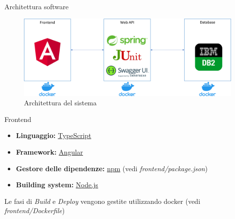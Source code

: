 \documentclass[10pt]{beamer}
\begin{document}
\begin{frame}{Architettura software}
	\begin{figure}[h]
		\centering
		\includegraphics[width=1\textwidth]
		{../images/software-architecture-diagram}
		
		\caption{Architettura del sistema}
	\end{figure}
\end{frame}

\begin{frame}{Frontend}
	
	\begin{itemize}
	
		\item
		\textbf{Linguaggio:} \href{https://www.typescriptlang.org/}{TypeScript}
		
		\item
		\textbf{Framework:} \href{https://angular.io/}{Angular}

		\item
		\textbf{Gestore delle dipendenze:} \href{https://www.npmjs.com/}{npm} (vedi \emph{frontend/package.json})
		
		\item
		\textbf{Building system:} \href{https://nodejs.org/}{Node.js}

	\end{itemize}
	
	Le fasi di \emph{Build} e \emph{Deploy} vengono gestite utilizzando docker (vedi \emph{frontend/Dockerfile})
\end{frame}
\end{document}
